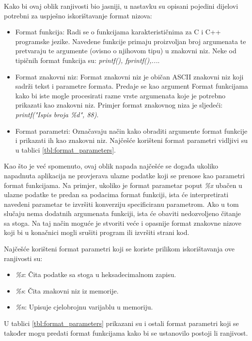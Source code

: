 \documentclass[times, utf8, diplomski, numeric]{fer}
\begin{document}
Kako bi ovaj oblik ranjivosti bio jasniji, u nastavku su opisani pojedini dijelovi potrebni za uspješno iskorištavanje format nizova:
\begin{itemize}
\item Format funkcija: Radi se o funkcijama karakterističnima za C i C++ programske jezike. Navedene funkcije primaju proizvoljan broj argumenata te pretvaraju te argumente (ovisno o njihovom tipu) u znakovni niz. Neke od tipičnih format funkcija su: \emph{printf(), fprintf(),...}. 
\item Format znakovni niz: Format znakovni niz je običan ASCII znakovni niz koji sadrži tekst i parametre formata. Predaje se kao argument Format funkcijama kako bi iste mogle procesirati razne vrste argumenata koje je potrebno prikazati kao znakovni niz. Primjer format znakovnog niza je sljedeći: \emph{printf("Ispis broja \%d", 88)}.
\item Format parametri: Označavaju način kako obraditi argumente format funkcije i prikazati ih kao znakovni niz. Najčešće korišteni format parametri vidljivi su u tablici \ref{tbl:format_parameters}.
\end{itemize}
Kao što je već spomenuto, ovaj oblik napada najčešće se događa ukoliko napadnuta aplikacija ne provjerava ulazne podatke koji se prenose kao parametri format funkcijama. Na primjer, ukoliko je format parametar poput \emph{\%x} ubačen u ulazne podatke te predan sa podacima format funkciji, ista će interpretirati navedeni parametar te izvršiti konverziju specificiranu parametrom. Ako u tom slučaju nema dodatnih argumenata funkciji, ista će obaviti nedozvoljeno čitanje sa stoga. Na taj način moguće je stvoriti veće i opasnije format znakovne nizove koji bi u konačnici mogli srušiti program ili izvršiti strani kod.

Najčešće korišteni format parametri koji se koriste prilikom iskorištavanja ove ranjivosti su:
\begin{itemize}
\item \emph{\%x}: Čita podatke sa stoga u heksadecimalnom zapisu.
\item \emph{\%s}: Čita znakovni niz iz memorije.
\item \emph{\%n}: Upisuje cjelobrojnu varijablu u memoriju. 
\end{itemize}

U tablici \ref{tbl:format_parameters} prikazani su i ostali format parametri koji se također mogu predati format funkcijama kako bi se ustanovilo postoji li ranjivost.
\end{document}
